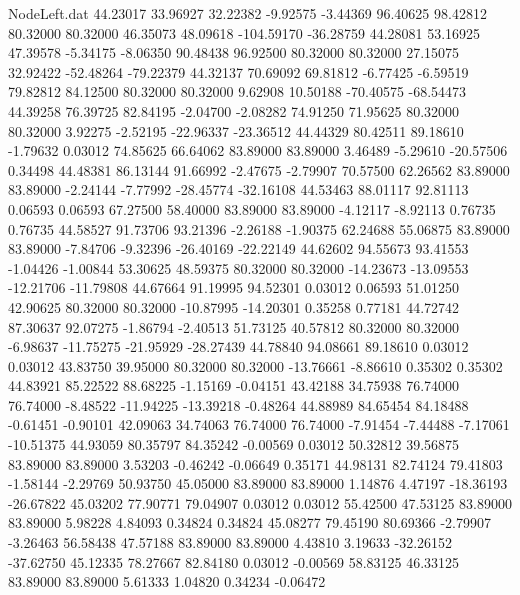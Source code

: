 \begin{filecontents}{NodeLeft.dat}
  44.23017   33.96927   32.22382    -9.92575   -3.44369   96.40625   98.42812   80.32000   80.32000   46.35073   48.09618 -104.59170  -36.28759
  44.28081   53.16925   47.39578    -5.34175   -8.06350   90.48438   96.92500   80.32000   80.32000   27.15075   32.92422  -52.48264  -79.22379
  44.32137   70.69092   69.81812    -6.77425   -6.59519   79.82812   84.12500   80.32000   80.32000    9.62908   10.50188  -70.40575  -68.54473
  44.39258   76.39725   82.84195    -2.04700   -2.08282   74.91250   71.95625   80.32000   80.32000    3.92275   -2.52195  -22.96337  -23.36512
  44.44329   80.42511   89.18610    -1.79632    0.03012   74.85625   66.64062   83.89000   83.89000    3.46489   -5.29610  -20.57506    0.34498
  44.48381   86.13144   91.66992    -2.47675   -2.79907   70.57500   62.26562   83.89000   83.89000   -2.24144   -7.77992  -28.45774  -32.16108
  44.53463   88.01117   92.81113     0.06593    0.06593   67.27500   58.40000   83.89000   83.89000   -4.12117   -8.92113    0.76735    0.76735
  44.58527   91.73706   93.21396    -2.26188   -1.90375   62.24688   55.06875   83.89000   83.89000   -7.84706   -9.32396  -26.40169  -22.22149
  44.62602   94.55673   93.41553    -1.04426   -1.00844   53.30625   48.59375   80.32000   80.32000  -14.23673  -13.09553  -12.21706  -11.79808
  44.67664   91.19995   94.52301     0.03012    0.06593   51.01250   42.90625   80.32000   80.32000  -10.87995  -14.20301    0.35258    0.77181
  44.72742   87.30637   92.07275    -1.86794   -2.40513   51.73125   40.57812   80.32000   80.32000   -6.98637  -11.75275  -21.95929  -28.27439
  44.78840   94.08661   89.18610     0.03012    0.03012   43.83750   39.95000   80.32000   80.32000  -13.76661   -8.86610    0.35302    0.35302
  44.83921   85.22522   88.68225    -1.15169   -0.04151   43.42188   34.75938   76.74000   76.74000   -8.48522  -11.94225  -13.39218   -0.48264
  44.88989   84.65454   84.18488    -0.61451   -0.90101   42.09063   34.74063   76.74000   76.74000   -7.91454   -7.44488   -7.17061  -10.51375
  44.93059   80.35797   84.35242    -0.00569    0.03012   50.32812   39.56875   83.89000   83.89000    3.53203   -0.46242   -0.06649    0.35171
  44.98131   82.74124   79.41803    -1.58144   -2.29769   50.93750   45.05000   83.89000   83.89000    1.14876    4.47197  -18.36193  -26.67822
  45.03202   77.90771   79.04907     0.03012    0.03012   55.42500   47.53125   83.89000   83.89000    5.98228    4.84093    0.34824    0.34824
  45.08277   79.45190   80.69366    -2.79907   -3.26463   56.58438   47.57188   83.89000   83.89000    4.43810    3.19633  -32.26152  -37.62750
  45.12335   78.27667   82.84180     0.03012   -0.00569   58.83125   46.33125   83.89000   83.89000    5.61333    1.04820    0.34234   -0.06472

\end{filecontents}
